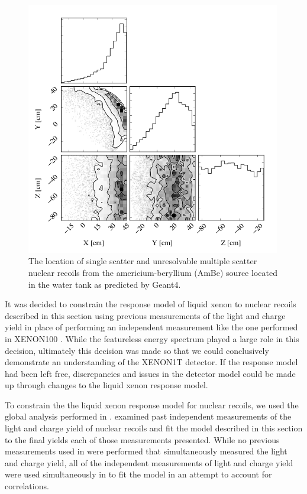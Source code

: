 \begin{figure}[t]
        \centering
	\includegraphics[width=0.99\textwidth]{xe1t_nr_positions}
	\caption{The location of single scatter and unresolvable multiple scatter nuclear recoils from the americium-beryllium (AmBe) source located in the water tank as predicted by Geant4.}
	\label{fig:xe1t_nr_positions}
\end{figure}


It was decided to constrain the response model of liquid xenon to nuclear recoils described in this section using previous measurements of the light and charge yield in place of performing an independent measurement like the one performed in XENON100 \cite{aprile2013response}.  While the featureless energy spectrum played a large role in this decision, ultimately this decision was made so that we could conclusively demonstrate an understanding of the XENON1T detector.  If the response model had been left free, discrepancies and issues in the detector model could be made up through changes to the liquid xenon response model.  

To constrain the the liquid xenon response model for nuclear recoils, we used the global analysis performed in .   examined past independent measurements of the light and charge yield of nuclear recoils and fit the model described in this section to the final yields each of those measurements presented.  While no previous measurements used in  were performed that simultaneously measured the light and charge yield, all of the independent measurements of light and charge yield were used simultaneously in  to fit the model in an attempt to account for correlations.  

